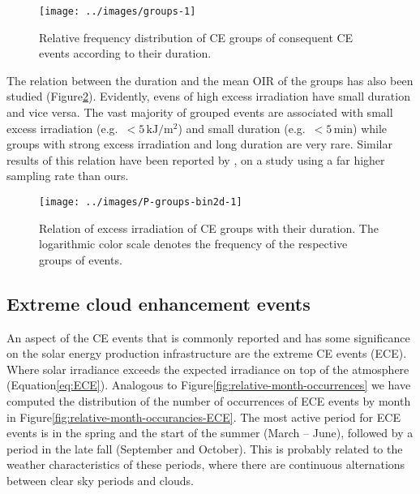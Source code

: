 \documentclass[preprint, 5p,
authoryear]{elsarticle} %
\begin{document}
\begin{figure}

{\centering \texttt{[image: ../images/groups-1]} 

}

\caption{Relative frequency distribution of CE groups of consequent CE events according to their duration.}\label{fig:ceg-duration-distribution}
\end{figure}

The relation between the duration and the mean OIR of the groups has
also been studied (Figure\nobreakspace{}\ref{fig:group-2d}). Evidently,
evens of high excess irradiation have small duration and vice versa. The
vast majority of grouped events are associated with small excess
irradiation (e.g.~\(<5\,\text{kJ}/\text{m}^2\)) and small duration
(e.g.~\(<5\,\text{min}\)) while groups with strong excess irradiation
and long duration are very rare. Similar results of this relation have
been reported by \citet{Zhang2018}, on a study using a far higher
sampling rate than ours.

\begin{figure}

{\centering \texttt{[image: ../images/P-groups-bin2d-1]} 

}

\caption{Relation of excess irradiation of CE groups with their duration. The logarithmic color scale denotes the frequency of the respective groups of events.}\label{fig:group-2d}
\end{figure}

\subsection{Extreme cloud enhancement
events}\label{extreme-cloud-enhancement-events}

An aspect of the CE events that is commonly reported and has some
significance on the solar energy production infrastructure are the
extreme CE events (ECE). Where solar irradiance exceeds the expected
irradiance on top of the atmosphere
(Equation\nobreakspace{}\ref{eq:ECE}). Analogous to
Figure\nobreakspace{}\ref{fig:relative-month-occurrences} we have
computed the distribution of the number of occurrences of ECE events by
month in Figure\nobreakspace{}\ref{fig:relative-month-occurancies-ECE}.
The most active period for ECE events is in the spring and the start of
the summer (March -- June), followed by a period in the late fall
(September and October). This is probably related to the weather
characteristics of these periods, where there are continuous
alternations between clear sky periods and clouds.
\end{document}
